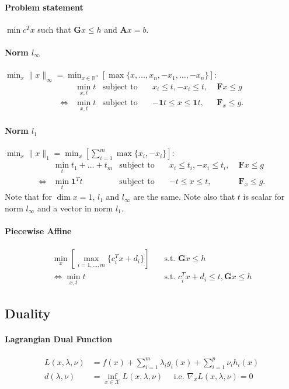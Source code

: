 \documentclass[landscape,a4paper,8pt]{scrartcl}
\newcommand{\mc}[1]{\mathcal{#1}}
\newcommand{\R}{\mathbb R}
\newcommand\vA{\bm{A}}
\newcommand\vF{\bm{F}}
\newcommand\vG{\bm{G}}
\begin{document}
\begin{multicols*}{3}
\paragraph{Problem statement} $\min c^Tx$ such that $\vG x \leq h$ and $\vA x = b$.
\paragraph{Norm $l_\infty$}
$\min_x \lVert x \rVert_\infty = \min_{x \in \R^n} \left[ \max\{x,\dots,x_n,-x_1,\dots,-x_n\}\right]$:
\begin{align*}
     & \min_{x,t} t & \text{subject to}\quad & x_i \leq t, -x_i \leq t,   \; & \vF x \leq g \\
\iff & \min_{x,t} t & \text{subject to}\quad & -{\bm 1} t \leq x \leq {\bm 1} t,\; & \vF_x \leq g.
\end{align*}

\paragraph{Norm $l_1$}
$\min_x \lVert x \rVert_1 = \min_x\left[\sum_{i=1}^{m} \max\{x_i,-x_i\}\right]$:
\begin{align*}
     & \min_{t} t_1 + \dots + t_m & \text{subject to}\quad & x_i \leq t_i, -x_i \leq t_i,\; & \vF x \leq g \\
\iff & \min_{t} {\bm 1}^Tt    & \text{subject to}\quad & -t \leq x \leq t,\;            & \vF_x \leq g.
\end{align*}
Note that for $\dim x = 1$, $l_1$ and $l_\infty$ are the same.
Note also that $t$ is scalar for norm $l_\infty$ and a vector in norm $l_1$.

\paragraph{Piecewise Affine}
\begin{align*}
\min_x \left[ \max_{i=1,\dots,m} \{ c_i^Tx + d_i \} \right] & \quad \text{s.t.\ } \vG x \leq h \\
\iff \min_{x,t} t & \quad \text{s.t.\ } c_i^T x + d_i \leq t, \vG x \leq h
\end{align*}

\subsection{Duality}
\paragraph{Lagrangian Dual Function}
\begin{align*}
	L(x,\lambda,\nu) & = f(x) + \sum_{i=1}^{m}\lambda_i g_i(x) + \sum_{i=1}^{p}\nu_i h_i(x) \\
	d(\lambda,\nu) & = \inf_{x \in \mc{X}} L(x,\lambda,\nu) \quad \text{ i.e. } \nabla_x L(x, \lambda, \nu) = 0
\end{align*}

\end{multicols*}
\end{document}
